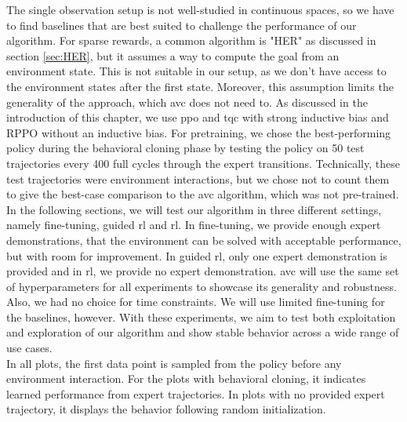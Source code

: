 The single observation setup is not well-studied in continuous spaces, so we have to find baselines that are best suited to challenge the performance of our algorithm. For sparse rewards, a common
algorithm is "HER" as discussed in section \ref{sec:HER}, but it assumes a way to compute the goal from an environment state. This is not suitable in our setup, as we don't have access to the environment
states after the first state. Moreover, this assumption limits the generality of the approach, which \ac{avc} does not need to.
As discussed in the introduction of this chapter, we use \ac{ppo} and \ac{tqc} with strong inductive bias and RPPO without an inductive bias. 
For pretraining, we chose the best-performing policy during the behavioral cloning phase by testing the policy on 50 test 
trajectories every 400 full cycles through the 
expert transitions. Technically, these test trajectories were environment interactions, but we chose not to count them to give the best-case comparison to the \ac{avc} algorithm, which was not pre-trained.\\

In the following sections, we will test our algorithm in three different settings, namely fine-tuning, guided \ac{rl} and \ac{rl}. In fine-tuning, we provide
enough expert demonstrations, that the environment can be solved with acceptable performance, but with room for improvement. In guided \ac{rl},
only one expert demonstration is provided and in \ac{rl}, we provide no expert demonstration. \ac{avc} will use the same set of hyperparameters for all experiments to showcase its generality and robustness. Also, we had no choice for time constraints.
We will use limited fine-tuning for the baselines, however.
With these experiments, we aim to test both exploitation and exploration of our algorithm and show stable
behavior across a wide range of use cases. \\

In all plots, the first data point is sampled from the policy before any environment interaction. For the plots with behavioral cloning, it indicates learned performance from expert trajectories.
In plots with no provided expert trajectory, it displays the behavior following random initialization.

